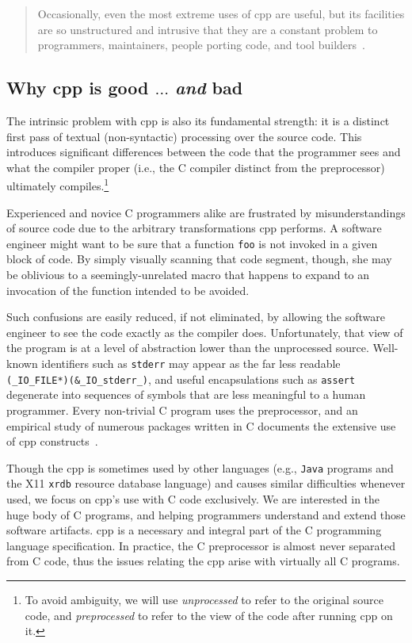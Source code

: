 \documentclass{article}
\newcommand{\Cpp}{\mbox{\textsf{cpp}}}
\newcommand{\C}{\mbox{C}}
\newcommand{\ie}{i.e.,}
\begin{document}
\begin{quotation}
\noindent Occasionally, even the most extreme uses of \Cpp{} are useful, but its
facilities are so unstructured and intrusive that they are a constant
problem to programmers, maintainers, people porting code, and tool
builders~\cite[p.~424]{Stroustrup94}.
\end{quotation}

\subsection{Why \Cpp{} is good $\ldots$ \emph{and} bad}

The intrinsic problem with \Cpp{} is also its fundamental strength: it
is a distinct first pass of textual (non-syntactic) processing over the
source code.  This introduces significant differences between the code
that the programmer sees and what the compiler proper (\ie{} the \C{}
compiler distinct from the preprocessor) ultimately
compiles.\footnote{To avoid ambiguity, we will use \emph{unprocessed} to
  refer to the original source code, and \emph{preprocessed} to refer to
  the view of the code after running \Cpp{} on it.}

Experienced and novice \C{} programmers alike are frustrated by
misunderstandings of source code due to the arbitrary transformations
\Cpp{} performs. A software engineer might want to be sure that a
function \texttt{foo} is not invoked in a given block of code.  By
simply visually scanning that code segment, though, she may be oblivious 
to a seemingly-unrelated macro that happens to expand to an invocation
of the function intended to be avoided.

Such confusions are easily reduced, if not eliminated,
by allowing the software engineer to see the code exactly as the
compiler does.  Unfortunately, that view of the program is at a level of
abstraction lower than the unprocessed source.  Well-known
identifiers such as \texttt{stderr} may appear as the far less readable
\texttt{(\_IO\_FILE*)(\&\_IO\_stderr\_)},
and useful encapsulations such as \texttt{assert} degenerate into
sequences of symbols that are less meaningful to a human programmer.  Every
non-trivial \C{} program uses the preprocessor, and an empirical study
of numerous packages written in \C{} documents the extensive use of \Cpp{}
constructs~\cite{EmpCpp-TR}.

Though the \Cpp{} is sometimes used by other languages (e.g.,
\texttt{Java} programs and the X11 \texttt{xrdb} resource database
language) and causes similar difficulties whenever used, we focus on
\Cpp{}'s use with \C{} code exclusively.  We are interested in the huge
body of \C{} programs, and helping programmers understand and extend
those software artifacts. \Cpp{} is a necessary and integral part of the
\C{} programming language specification.  In practice, the \C{}
preprocessor is almost never separated from \C{} code, thus the issues
relating the \Cpp{} arise with virtually all \C{} programs.
\end{document}
